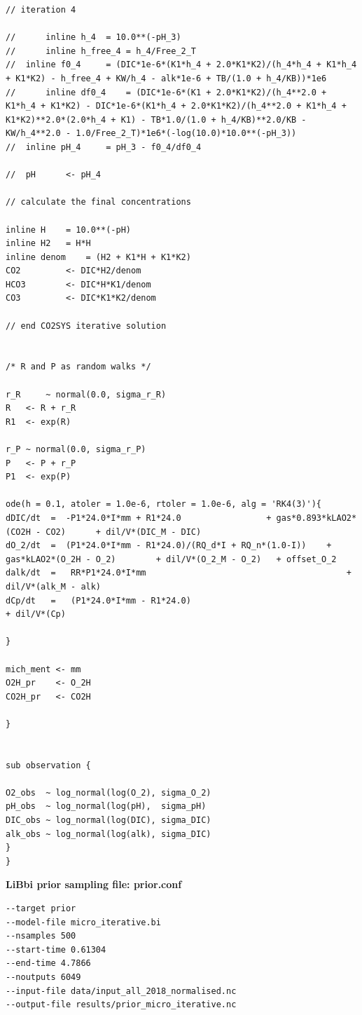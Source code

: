 \documentclass{ruthesis}
\begin{document}
\begin{lstlisting}
// iteration 4

//    	inline h_4 	= 10.0**(-pH_3)
//    	inline h_free_4 = h_4/Free_2_T
//	inline f0_4 	= (DIC*1e-6*(K1*h_4 + 2.0*K1*K2)/(h_4*h_4 + K1*h_4 + K1*K2) - h_free_4 + KW/h_4 - alk*1e-6 + TB/(1.0 + h_4/KB))*1e6
//    	inline df0_4 	= (DIC*1e-6*(K1 + 2.0*K1*K2)/(h_4**2.0 + K1*h_4 + K1*K2) - DIC*1e-6*(K1*h_4 + 2.0*K1*K2)/(h_4**2.0 + K1*h_4 + K1*K2)**2.0*(2.0*h_4 + K1) - TB*1.0/(1.0 + h_4/KB)**2.0/KB - KW/h_4**2.0 - 1.0/Free_2_T)*1e6*(-log(10.0)*10.0**(-pH_3))
//	inline pH_4 	= pH_3 - f0_4/df0_4

//	pH		<- pH_4

// calculate the final concentrations

inline H 	= 10.0**(-pH)
inline H2 	= H*H
inline denom 	= (H2 + K1*H + K1*K2)
CO2  		<- DIC*H2/denom
HCO3 		<- DIC*H*K1/denom
CO3  		<- DIC*K1*K2/denom  

// end CO2SYS iterative solution


/* R and P as random walks */

r_R 	~ normal(0.0, sigma_r_R)
R 	<- R + r_R
R1 	<- exp(R)

r_P ~ normal(0.0, sigma_r_P)
P 	<- P + r_P
P1 	<- exp(P)

ode(h = 0.1, atoler = 1.0e-6, rtoler = 1.0e-6, alg = 'RK4(3)'){
dDIC/dt  =  -P1*24.0*I*mm + R1*24.0 				+ gas*0.893*kLAO2*(CO2H - CO2)		+ dil/V*(DIC_M - DIC)  		 
dO_2/dt	 =  (P1*24.0*I*mm - R1*24.0)/(RQ_d*I + RQ_n*(1.0-I)) 	+ gas*kLAO2*(O_2H - O_2)		+ dil/V*(O_2_M - O_2)	+ offset_O_2 		
dalk/dt  =   RR*P1*24.0*I*mm										+ dil/V*(alk_M - alk)
dCp/dt	 =   (P1*24.0*I*mm - R1*24.0) 									+ dil/V*(Cp)

}

mich_ment <- mm
O2H_pr 	  <- O_2H
CO2H_pr   <- CO2H

}


sub observation {

O2_obs  ~ log_normal(log(O_2), sigma_O_2)
pH_obs  ~ log_normal(log(pH),  sigma_pH)
DIC_obs ~ log_normal(log(DIC), sigma_DIC) 
alk_obs ~ log_normal(log(alk), sigma_DIC)
}
}
\end{lstlisting}

\textbf{LiBbi prior sampling file: prior.conf}
\begin{lstlisting}
--target prior
--model-file micro_iterative.bi
--nsamples 500
--start-time 0.61304
--end-time 4.7866
--noutputs 6049
--input-file data/input_all_2018_normalised.nc
--output-file results/prior_micro_iterative.nc
\end{lstlisting}
\end{document}
